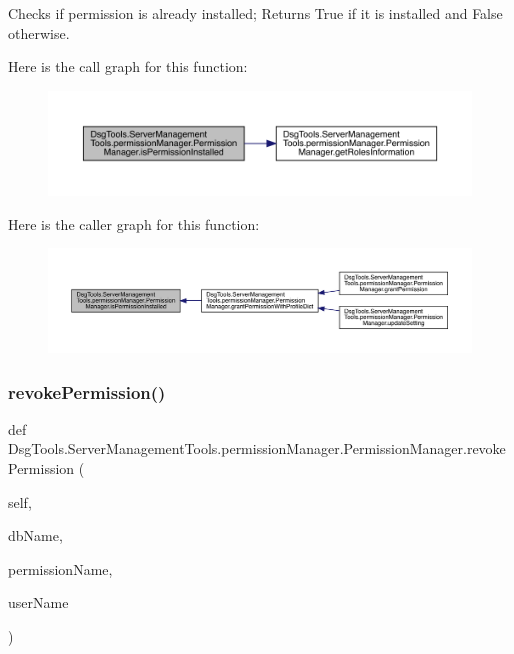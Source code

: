 \begin{DoxyVerb}Checks if permission is already installed;
Returns True if it is installed and False otherwise.
\end{DoxyVerb}
 Here is the call graph for this function\+:
\nopagebreak
\begin{figure}[H]
\begin{center}
\leavevmode
\includegraphics[width=350pt]{class_dsg_tools_1_1_server_management_tools_1_1permission_manager_1_1_permission_manager_afa4a334bad05fec83bdcb570ac716aaa_cgraph}
\end{center}
\end{figure}
Here is the caller graph for this function\+:
\nopagebreak
\begin{figure}[H]
\begin{center}
\leavevmode
\includegraphics[width=350pt]{class_dsg_tools_1_1_server_management_tools_1_1permission_manager_1_1_permission_manager_afa4a334bad05fec83bdcb570ac716aaa_icgraph}
\end{center}
\end{figure}
\mbox{\label{class_dsg_tools_1_1_server_management_tools_1_1permission_manager_1_1_permission_manager_a3ad2577af28425c49f5013968937dde5}} 
\subsubsection{\texorpdfstring{revoke\+Permission()}{revokePermission()}}
{\footnotesize\ttfamily def Dsg\+Tools.\+Server\+Management\+Tools.\+permission\+Manager.\+Permission\+Manager.\+revoke\+Permission (\begin{DoxyParamCaption}\item[{}]{self,  }\item[{}]{db\+Name,  }\item[{}]{permission\+Name,  }\item[{}]{user\+Name }\end{DoxyParamCaption})}

